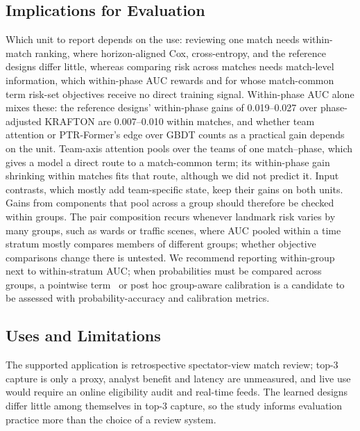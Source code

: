 \documentclass[sigconf,anonymous,nonacm]{acmart}
\begin{document}
\subsection{Implications for Evaluation}
\label{sec:discussion:implications}
Which unit to report depends on the use: reviewing one match needs within-match ranking, where horizon-aligned Cox, cross-entropy, and the reference designs differ little, whereas comparing risk across matches needs match-level information, which within-phase AUC rewards and for whose match-common term risk-set objectives receive no direct training signal. Within-phase AUC alone mixes these: the reference designs' within-phase gains of 0.019--0.027 over phase-adjusted KRAFTON are 0.007--0.010 within matches, and whether team attention or PTR-Former's edge over GBDT counts as a practical gain depends on the unit. Team-axis attention pools over the teams of one match--phase, which gives a model a direct route to a match-common term; its within-phase gain shrinking within matches fits that route, although we did not predict it. Input contrasts, which mostly add team-specific state, keep their gains on both units. Gains from components that pool across a group should therefore be checked within groups. The pair composition recurs whenever landmark risk varies by many groups, such as wards or traffic scenes, where AUC pooled within a time stratum mostly compares members of different groups; whether objective comparisons change there is untested. We recommend reporting within-group next to within-stratum AUC; when probabilities must be compared across groups, a pointwise term~\cite{Bai23} or post hoc group-aware calibration is a candidate to be assessed with probability-accuracy and calibration metrics.

\subsection{Uses and Limitations}
\label{sec:discussion:limits}
The supported application is retrospective spectator-view match review; top-3 capture is only a proxy, analyst benefit and latency are unmeasured, and live use would require an online eligibility audit and real-time feeds. The learned designs differ little among themselves in top-3 capture, so the study informs evaluation practice more than the choice of a review system.
\end{document}

